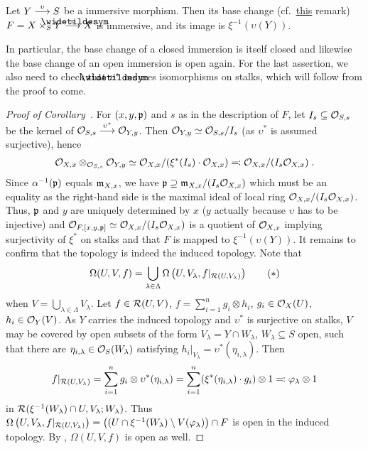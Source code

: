 \documentclass[a4paper,parskip=half,numbers=enddot, DIV=12]{scrreprt}
\begin{document}
\begin{cor}
    Let $Y\morphism[\upsilon]S$ be a immersive morphism. Then its base change (cf.\ \hyperref[rem:baseChange]{this} remark) $F=X\times_SY\morphism[\snake \upsilon] X$ is immersive, and its image is $\xi^{-1}(\upsilon(Y))$.
\end{cor}
\begin{rem*}
	 In particular, the base change of a closed immersion is itself closed and likewise the base change of an open immersion is open again. For the last assertion, we also need to check that $\snake{\upsilon}^*$ induces isomorphisms on stalks, which will follow from the proof to come.
\end{rem*}
\begin{proof}[Proof of Corollary~]
    For $(x,y,\mathfrak{p})$ and $s$ as in the description of $F$, let $I_s\subseteq \mathcal{O}_{S,s}$ be the kernel of $\Oo_{S,s}\morphism[\upsilon^*] \Oo_{Y,y}$. Then $\mathcal{O}_{Y,y}\simeq \mathcal{O}_{S,s}/I_s$ (as $\upsilon^*$ is assumed surjective), hence 
    \begin{align*}
    	\mathcal{O}_{X,x}\otimes_{\mathcal{O}_{S,s}}\mathcal{O}_{Y,y} \simeq \mathcal{O}_{X,x}/(\xi^*(I_s) \cdot \mathcal{O}_{X,x}) \eqqcolon \mathcal{O}_{X,x}/(I_s\mathcal{O}_{X,x})\;. 
    \end{align*}
    Since $\alpha^{-1}(\mathfrak{p})$ equals $\mathfrak{m}_{X,x}$, we have $\mathfrak{p}\supseteq \mathfrak{m}_{X,x}/(I_s \mathcal{O}_{X,x})$ which must be an equality as the right-hand side is the maximal ideal of local ring $\mathcal{O}_{X,x}/(I_s \mathcal{O}_{X,x})$. Thus, $\mathfrak{p}$ and $y$ are uniquely determined by $x$ ($y$ actually because $\upsilon$ has to be injective) and $\mathcal{O}_{F,[x,y,\mathfrak{p}]}\simeq \mathcal{O}_{X,x}/(I_s \mathcal{O}_{X,x})$ is a quotient of $\mathcal{O}_{X,x}$ implying surjectivity of $\xi^*$ on stalks and that $F$ is mapped to $\xi^{-1}(\upsilon(Y))$. It remains to confirm that the topology is indeed the induced topology. Note that
    \begin{align}\lbl{eq:omegaCover}
        \Omega(U,V,f) = \bigcup_{\lambda\in \Lambda} \Omega\left(U,V_\lambda, f|_{\Rr(U,V_\lambda)}\right)\tag{$*$}
    \end{align}
    when $V=\bigcup_{\lambda\in \Lambda} V_\lambda$. Let $f\in \mathcal{R}(U,V)$, $f=\sum_{i=1}^n g_i\otimes h_i$, $g_i\in \mathcal{O}_X(U)$, $h_i\in\mathcal{O}_Y(V)$. As $Y$ carries the induced topology and $\upsilon^*$ is surjective on stalks, $V$ may be covered by open subsets of the form $V_\lambda = Y\cap W_\lambda$, $W_\lambda \subseteq S$ open, such that there are $\eta_{i,\lambda}\in \mathcal{O}_S(W_\lambda)$ satisfying $h_i|_{V_\lambda} = \upsilon^*(\eta_{i,\lambda})$. Then
    \begin{align*}
        f|_{\mathcal{R}(U,V_\lambda)} = \sum_{i=1}^n g_i\otimes \upsilon^*(\eta_{i,\lambda}) = \sum_{i=1}^n (\xi^*(\eta_{i,\lambda})\cdot g_i) \otimes 1 \eqqcolon\varphi_\lambda\otimes 1
    \end{align*}
    in $\mathcal{R}(\xi^{-1}(W_\lambda)\cap U, V_\lambda; W_\lambda)$. Thus $\Omega\left(U,V_\lambda, f|_{\mathcal{R}(U,V_\lambda)}\right) = \big((U\cap \xi^{-1}(W_\lambda)\setminus V(\varphi_\lambda)\big)\cap F$ is open in the induced topology. By , $\Omega(U,V,f)$ is open as well.
\end{proof}
\end{document}
